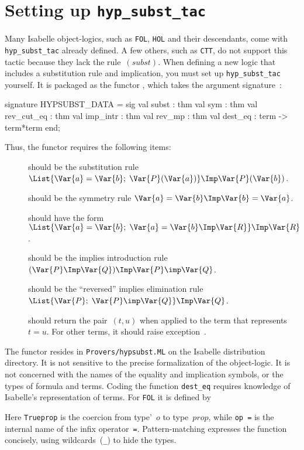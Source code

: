 \section{Setting up {\tt hyp_subst_tac}} 
Many Isabelle object-logics, such as {\tt FOL}, {\tt HOL} and their
descendants, come with {\tt hyp_subst_tac} already defined.  A few others,
such as {\tt CTT}, do not support this tactic because they lack the
rule~$(subst)$.  When defining a new logic that includes a substitution
rule and implication, you must set up {\tt hyp_subst_tac} yourself.  It
is packaged as the \ML{} functor , which takes the
argument signature~:
\begin{ttbox} 
signature HYPSUBST_DATA =
  sig
  val subst      : thm
  val sym        : thm
  val rev_cut_eq : thm
  val imp_intr   : thm
  val rev_mp     : thm
  val dest_eq    : term -> term*term
  end;
\end{ttbox}
Thus, the functor requires the following items:
\begin{description}
\item[] should be the substitution rule
$\List{\Var{a}=\Var{b};\; \Var{P}(\Var{a})} \Imp \Var{P}(\Var{b})$.

\item[] should be the symmetry rule
$\Var{a}=\Var{b}\Imp\Var{b}=\Var{a}$.

\item[] should have the form
$\List{\Var{a}=\Var{b};\; \Var{a}=\Var{b}\Imp\Var{R}} \Imp \Var{R}$.

\item[] should be the implies introduction
rule $(\Var{P}\Imp\Var{Q})\Imp \Var{P}\imp\Var{Q}$.

\item[] should be the ``reversed'' implies elimination
rule $\List{\Var{P};  \;\Var{P}\imp\Var{Q}} \Imp \Var{Q}$.

\item[] should return the pair~$(t,u)$ when
applied to the \ML{} term that represents~$t=u$.  For other terms, it
should raise exception~.
\end{description}
The functor resides in {\tt Provers/hypsubst.ML} on the Isabelle
distribution directory.  It is not sensitive to the precise formalization
of the object-logic.  It is not concerned with the names of the equality
and implication symbols, or the types of formula and terms.  Coding the
function {\tt dest_eq} requires knowledge of Isabelle's representation of
terms.  For {\tt FOL} it is defined by
Here {\tt Trueprop} is the coercion from type'~$o$ to type~$prop$, while
\hbox{\tt op =} is the internal name of the infix operator~{\tt=}.
Pattern-matching expresses the function concisely, using wildcards~({\tt_})
to hide the types.

